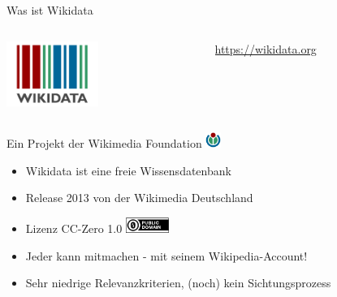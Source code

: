 \documentclass{beamer}
\begin{document}
\begin{frame}{Was ist Wikidata}

      \vspace{-0.5cm}
  \begin{columns}[c]
    \begin{column}[T]{.4\textwidth}
      \begin{center}
        \includegraphics[width=3cm]{Wikidata-logo-en.pdf}
      \end{center}
    \end{column}
    \begin{column}[T]{.6\textwidth}
      \vspace{1.5cm}
      \Large{\url{https://wikidata.org}}
    \end{column}
  \end{columns}

      \vspace{0.5cm}
  Ein Projekt der Wikimedia Foundation \includegraphics[height=5mm]{Wikimedia-logo.pdf}

\begin{itemize}
  \item Wikidata ist eine freie Wissensdatenbank
  \item Release 2013 von der Wikimedia Deutschland
  \item Lizenz CC-Zero 1.0 \includegraphics[height=5mm]{cc-zero.pdf} \pause
  \item Jeder kann mitmachen - mit seinem Wikipedia-Account! \pause
  \item Sehr niedrige Relevanzkriterien, (noch) kein Sichtungsprozess
\end{itemize}

\end{frame}
\end{document}
